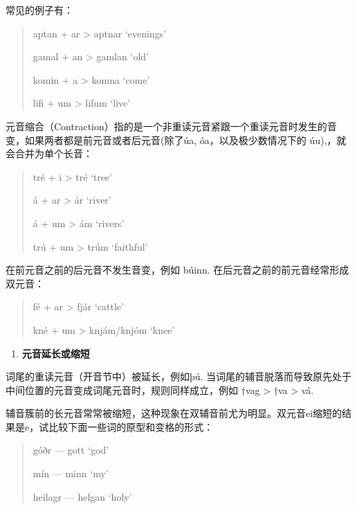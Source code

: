 常见的例子有：

\begin{quote}
aptan + ar \textgreater{} aptnar `evenings'

gamal + an \textgreater{} gamlan `old'

komin + a \textgreater{} komna `come'

lifi + um \textgreater{} lifum `live'
\end{quote}

元音缩合（Contraction）指的是一个非重读元音紧跟一个重读元音时发生的音变，如果两者都是前元音或者后元音(除了úa,
óa，以及极少数情况下的 úu),，就会合并为单个长音：

\begin{quote}
tré + i \textgreater{} tré `tree'

á + ar \textgreater{} ár `river'

á + um \textgreater{} ám `rivers'

trú + um \textgreater{} trúm `faithful'
\end{quote}

在前元音之前的后元音不发生音变，例如 búinn.
在后元音之前的前元音经常形成双元音：

\begin{quote}
fé + ar \textgreater{} fjár `cattle'

kné + um \textgreater{} knjám/knjóm `knee'
\end{quote}

\begin{enumerate}
\def\labelenumi{\Alph{enumi}.}
\setcounter{enumi}{2}
\item
  \textbf{元音延长或缩短}
\end{enumerate}

词尾的重读元音（开音节中）被延长，例如þú.
当词尾的辅音脱落而导致原先处于中间位置的元音变成词尾元音时，规则同样成立，例如
†vag \textgreater{} †va \textgreater{} vá.

辅音簇前的长元音常常被缩短，这种现象在双辅音前尤为明显。双元音ei缩短的结果是e，试比较下面一些词的原型和变格的形式：

\begin{quote}
góðr --- gott `god'

mín --- minn `my'

heilagr --- helgan `holy'
\end{quote}

